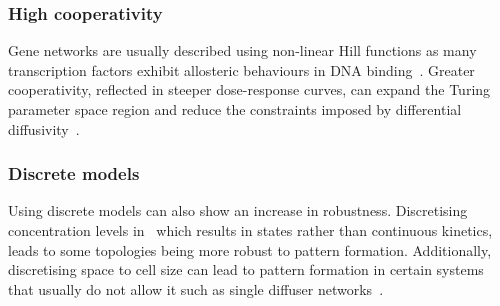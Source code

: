 \subsubsection{High cooperativity}
Gene networks are usually described using non-linear Hill functions as many transcription factors exhibit allosteric behaviours in DNA binding~\parencite{Morgunova2017}.
Greater cooperativity, reflected in steeper dose-response curves, can expand the Turing parameter space region and reduce the constraints imposed by differential diffusivity~\parencite{Diambra2015a}.
%
%


\subsubsection{Discrete models}
Using discrete models can also show an increase in robustness.
Discretising concentration levels in~\cite{Leyshon2021} which results in states rather than continuous kinetics, leads to some topologies being more robust to pattern formation. %
Additionally, discretising space to cell size can lead to pattern formation in certain systems that usually do not allow it such as single diffuser networks~\parencite{Wang2022}.

